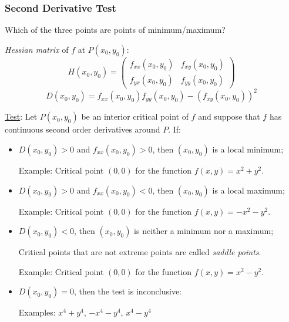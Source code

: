 \begin{frame}
  \frametitle{Second Derivative Test}

Which of the three points are points of minimum/maximum?\pause

\emph{Hessian matrix} of $f$ at $P(x_0,y_0)$:
%
$$H(x_0,y_0) = \left(\!
\begin{array}{cc}
  f_{xx}(x_0,y_0) & f_{xy}(x_0,y_0) \\
  f_{yx}(x_0,y_0) & f_{yy}(x_0,y_0)
\end{array}\!
 \right)\; $$
%
$$D(x_0,y_0) = f_{xx}(x_0,y_0) f_{yy}(x_0,y_0) - (f_{xy}(x_0,y_0))^2\; $$
%

\pause
\underline{Test}: Let $P(x_0,y_0)$ be an interior critical point of $f$ and suppose that $f$ has continuous second order derivatives around $P$. If:
%
\begin{itemize}
  \item \pause $D(x_0,y_0)>0$ and $f_{xx}(x_0,y_0)>0$, then $(x_0,y_0)$ is a local minimum;

      Example: Critical point $(0,0)$ for the function $f(x,y)=x^2+y^2$.

  \item \pause $D(x_0,y_0)>0$ and $f_{xx}(x_0,y_0)<0$, then $(x_0,y_0)$ is a local maximum;

      Example: Critical point $(0,0)$ for the function $f(x,y)=-x^2-y^2$.

  \item \pause $D(x_0,y_0)<0$, then $(x_0,y_0)$ is neither a minimum nor a maximum;

  Critical points that are not extreme points are called \emph{saddle points}.

        Example: Critical point $(0,0)$ for the function $f(x,y)=x^2-y^2$.

  \item \pause $D(x_0,y_0)=0$, then the test is inconclusive:

  Examples: $x^4+y^4$, $-x^4-y^4$, $x^4-y^4$

\end{itemize}
\end{frame}